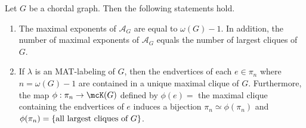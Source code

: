 \begin{proposition}\label{the number of maximal exponents = the number of largest cliques}
Let $ G $ be a chordal graph. Then the following statements hold. 
\begin{enumerate}[(1)]
\item The maximal exponents of $ \mathcal{A}_{G} $ are equal to $ \omega(G)-1 $. 
In addition, the number of maximal exponents of $ \mathcal{A}_{G} $ equals the number of largest cliques of $ G $.  
\item  If $ \lambda $ is an MAT-labeling of  $ G $, then the endvertices of each $ e \in  \pi_{n}$ where $n = \omega(G)-1$ are contained in a unique maximal clique of $G$. 
Furthermore, the map $ \phi : \pi_{n} \to \mcK(G)$ defined by $\phi(e)=$ the maximal clique containing the endvertices of $ e$ induces a bijection $ \pi_{n} \simeq \phi(\pi_{n})$ and $\phi(\pi_{n})=\{\mbox{all largest cliques of $ G $}\}$. 
\end{enumerate}
 
\end{proposition}
